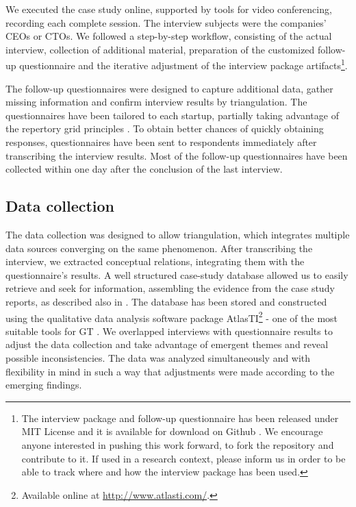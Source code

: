 \documentclass[10pt,journal,letterpaper,compsoc]{IEEEtran}
\begin{document}
We executed the case study online, supported by tools for video conferencing,
recording each complete session. The interview subjects were the companies' CEOs
or CTOs. We followed a step-by-step workflow, consisting of the actual
interview, collection of additional material, preparation of the customized
follow-up questionnaire and the iterative adjustment of the interview package
artifacts\footnote{The interview package and follow-up questionnaire has been
released under MIT License \cite{MITLicense} and it is available for download on
Github \cite{GitHubInterviewPackage}. We encourage anyone interested in pushing
this work forward, to fork the repository and contribute to it. If used in a
research context, please inform us in order to be able to track where and how
the interview package has been used.}.

The follow-up questionnaires were designed to capture additional data, gather
missing information and confirm interview results by triangulation. The
questionnaires have been tailored to each startup, partially taking advantage of
the repertory grid principles \cite{Edwards2009}. To obtain better chances of
quickly obtaining responses, questionnaires have been sent to respondents
immediately after transcribing the interview results. Most of the follow-up
questionnaires have been collected within one day after the conclusion of the
last interview.    

\subsection{Data collection} The data collection was designed to allow
triangulation, which integrates  multiple data sources converging on the same
phenomenon. After transcribing the  interview, we extracted conceptual
relations, integrating them with the  questionnaire's results. A well structured
case-study database allowed us to  easily retrieve and seek for information,
assembling the evidence from the case  study reports, as described also in
\cite{Yin1994}. The database has been stored  and constructed using the
qualitative data analysis software package  AtlasTI\footnote{Available online at
\url{http://www.atlasti.com/}.} - one of  the most suitable tools for GT
\cite{Coleman2007}.  We overlapped interviews with questionnaire results to
adjust the data  collection and take advantage of emergent themes and reveal
possible  inconsistencies. The data was analyzed simultaneously and with
flexibility in  mind in such a way that adjustments were made according to the
emerging  findings.
\end{document}
